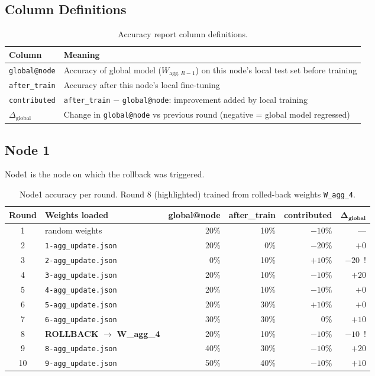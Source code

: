 \documentclass[11pt]{article}
\begin{document}
\subsection{Column Definitions}

\begin{table}[H]
\centering
\begin{tabular}{ll}
\toprule
\textbf{Column} & \textbf{Meaning} \\
\midrule
\texttt{global@node} & Accuracy of global model ($W_{\text{agg},R-1}$) on this node's local test set before training \\
\texttt{after\_train} & Accuracy after this node's local fine-tuning \\
\texttt{contributed} & \texttt{after\_train} $-$ \texttt{global@node}: improvement added by local training \\
$\Delta_\text{global}$ & Change in \texttt{global@node} vs previous round (negative = global model regressed) \\
\bottomrule
\end{tabular}
\caption{Accuracy report column definitions.}
\end{table}

\subsection{Node 1}

Node1 is the node on which the rollback was triggered.

\begin{table}[H]
\centering
\begin{tabular}{clrrrr}
\toprule
\textbf{Round} & \textbf{Weights loaded} & \textbf{global@node} & \textbf{after\_train} & \textbf{contributed} & $\boldsymbol{\Delta_\text{global}}$ \\
\midrule
1  & random weights          & 20\% & 10\% & $-10$\% & ---       \\
2  & \texttt{1-agg\_update.json} & 20\% & 0\%  & $-20$\% & $+0$   \\
3  & \texttt{2-agg\_update.json} & 0\%  & 10\% & $+10$\% & $-20$~! \\
4  & \texttt{3-agg\_update.json} & 20\% & 10\% & $-10$\% & $+20$  \\
5  & \texttt{4-agg\_update.json} & 20\% & 10\% & $-10$\% & $+0$   \\
6  & \texttt{5-agg\_update.json} & 20\% & 30\% & $+10$\% & $+0$   \\
7  & \texttt{6-agg\_update.json} & 30\% & 30\% & $0$\%   & $+10$  \\
\rowcolor{yellow!30}
8  & \textbf{ROLLBACK} $\rightarrow$ \textbf{W\_agg\_4} & 20\% & 10\% & $-10$\% & $-10$~! \\
9  & \texttt{8-agg\_update.json} & 40\% & 30\% & $-10$\% & $+20$  \\
10 & \texttt{9-agg\_update.json} & 50\% & 40\% & $-10$\% & $+10$  \\
\bottomrule
\end{tabular}
\caption{Node1 accuracy per round. Round 8 (highlighted) trained from rolled-back weights \texttt{W\_agg\_4}.}
\end{table}
\end{document}
